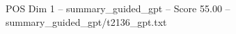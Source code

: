 \begin{textsample}{POS Dim 1 – summary\_guided\_gpt – Score 55.00 – summary\_guided\_gpt/t2136\_gpt.txt}
\end{textsample}
